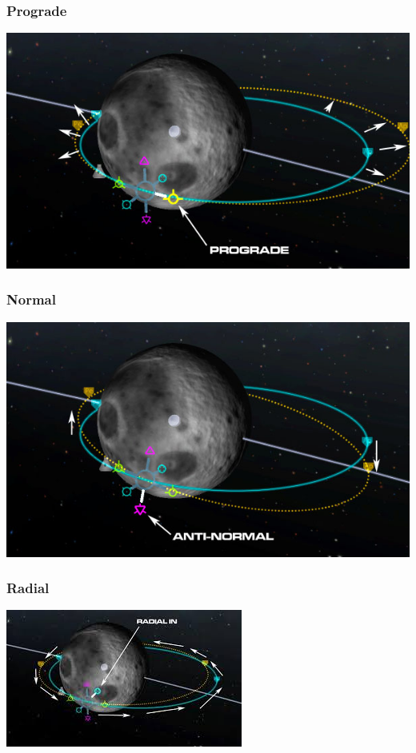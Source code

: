 \begin{frame}
    \frametitle{Prograde}
    \begin{center}
        \includegraphics[scale=0.5]{images/prograde.jpg}
    \end{center}
\end{frame}
\begin{frame}
    \frametitle{Normal}
    \begin{center}
        \includegraphics[scale=0.5]{images/anti_normal.jpg}
    \end{center}
\end{frame}
\begin{frame}
    \frametitle{Radial}
    \begin{center}
        \includegraphics[]{images/radial.jpg}
    \end{center}
\end{frame}
